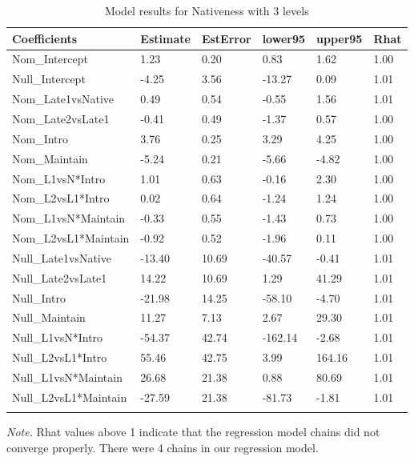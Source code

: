 \documentclass[]{elsarticle} %
\begin{document}
\label{section:d}

\begin{table}[hbt!]

\begin{center}
\begin{threeparttable}

\caption{\label{tab:unnamed-chunk-4}Model results for Nativeness with 3 levels}

\small{

\begin{tabular}{llllll}
\toprule
Coefficients & \multicolumn{1}{c}{Estimate} & \multicolumn{1}{c}{EstError} & \multicolumn{1}{c}{lower95} & \multicolumn{1}{c}{upper95} & \multicolumn{1}{c}{Rhat}\\
\midrule
Nom\_Intercept & 1.23 & 0.20 & 0.83 & 1.62 & 1.00\\
Null\_Intercept & -4.25 & 3.56 & -13.27 & 0.09 & 1.01\\
Nom\_Late1vsNative & 0.49 & 0.54 & -0.55 & 1.56 & 1.01\\
Nom\_Late2vsLate1 & -0.41 & 0.49 & -1.37 & 0.57 & 1.00\\
Nom\_Intro & 3.76 & 0.25 & 3.29 & 4.25 & 1.00\\
Nom\_Maintain & -5.24 & 0.21 & -5.66 & -4.82 & 1.00\\
Nom\_L1vsN*Intro & 1.01 & 0.63 & -0.16 & 2.30 & 1.00\\
Nom\_L2vsL1*Intro & 0.02 & 0.64 & -1.24 & 1.24 & 1.00\\
Nom\_L1vsN*Maintain & -0.33 & 0.55 & -1.43 & 0.73 & 1.00\\
Nom\_L2vsL1*Maintain & -0.92 & 0.52 & -1.96 & 0.11 & 1.00\\
Null\_Late1vsNative & -13.40 & 10.69 & -40.57 & -0.41 & 1.01\\
Null\_Late2vsLate1 & 14.22 & 10.69 & 1.29 & 41.29 & 1.01\\
Null\_Intro & -21.98 & 14.25 & -58.10 & -4.70 & 1.01\\
Null\_Maintain & 11.27 & 7.13 & 2.67 & 29.30 & 1.01\\
Null\_L1vsN*Intro & -54.37 & 42.74 & -162.14 & -2.68 & 1.01\\
Null\_L2vsL1*Intro & 55.46 & 42.75 & 3.99 & 164.16 & 1.01\\
Null\_L1vsN*Maintain & 26.68 & 21.38 & 0.88 & 80.69 & 1.01\\
Null\_L2vsL1*Maintain & -27.59 & 21.38 & -81.73 & -1.81 & 1.01\\
\bottomrule
\addlinespace
\end{tabular}

}

\begin{tablenotes}[para]
\normalsize{\textit{Note.} Rhat values above 1 indicate that the regression model chains did not converge properly. There were 4 chains in our regression model.}
\end{tablenotes}

\end{threeparttable}
\end{center}

\end{table}
\end{document}

